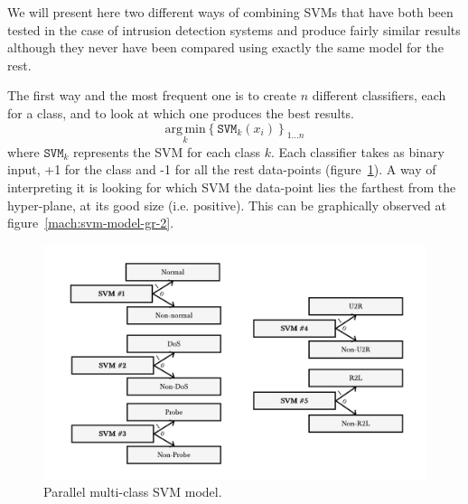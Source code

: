 We will present here two different ways of combining SVMs that have both been tested in the case of intrusion detection systems \cite{Kuang2014ADetection}\cite{SumaiyaThaseen2017IntrusionSVM} and produce fairly similar results although they never have been compared using exactly the same model for the rest.

The first way and the most frequent one is to create $n$ different classifiers, each for a class, and to look at which one produces the best results. 
\begin{equation}
    \underset{k}{\mathrm{arg}\,\mathrm{min}}\left\{ \mathtt{SVM}_k (x_i)   \right\}_{1 \ldots n} 
\end{equation}
where $\mathtt{SVM}_k$ represents the SVM for each class $k$. Each classifier takes as binary input, +1 for the class and -1 for all the rest data-points  (figure~\ref{mach:svm-model-1}). A way of interpreting it is looking for which SVM the data-point lies the farthest from the hyper-plane, at its good size (i.e. positive). This can be graphically observed at figure~\ref{mach:svm-model-gr-2}.

\begin{figure}[ht!]
    \centering
    \includegraphics[width=.85\textwidth]{parts/chap-2/img-2/model-svm-1.png}
    \caption{Parallel multi-class SVM model.} 
    \label{mach:svm-model-1}
\end{figure}

